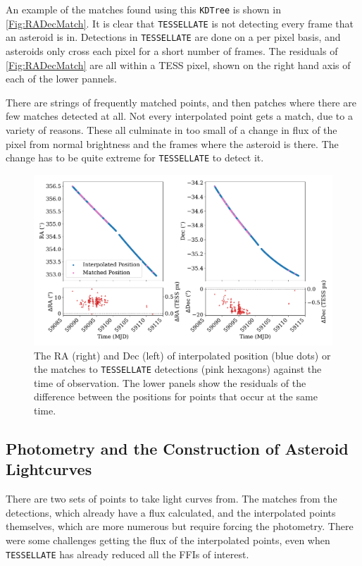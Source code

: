 \documentclass{UCreport}
\begin{document}
An example of the matches found using this \texttt{KDTree} is shown in \autoref{Fig:RADecMatch}.
It is clear that \texttt{TESSELLATE} is not detecting every frame that an asteroid is in.
Detections in \texttt{TESSELLATE} are done on a per pixel basis, and asteroids only cross each pixel for a short number of frames.
The residuals of \autoref{Fig:RADecMatch} are all within a TESS pixel, shown on the right hand axis of each of the lower pannels. 

There are strings of frequently matched points, and then patches where there are few matches detected at all.
Not every interpolated point gets a match, due to a variety of reasons.
These all culminate in too small of a change in flux of the pixel from normal brightness and the frames where the asteroid is there.
The change has to be quite extreme for \texttt{TESSELLATE} to detect it.


\begin{figure}[]
  \centering
  \includegraphics[width =\textwidth]{./Figures/DetectMatchPosUlysses.pdf}
  \caption[Interpolated and Detected Positions]{The RA (right) and Dec (left) of interpolated position (blue dots) or the matches to \texttt{TESSELLATE} detections (pink hexagons) against the time of observation. The lower panels show the residuals of the difference between the positions for points that occur at the same time.}
  \label{Fig:RADecMatch}
\end{figure}

\subsection{Photometry and the Construction of Asteroid Lightcurves}\label{SubSec:Lightcurves}

There are two sets of points to take light curves from.
The matches from the detections, which already have a flux calculated, and the interpolated points themselves, which are more numerous but require forcing the photometry.
There were some challenges getting the flux of the interpolated points, even when \texttt{TESSELLATE} has already reduced all the FFIs of interest.
\end{document}
